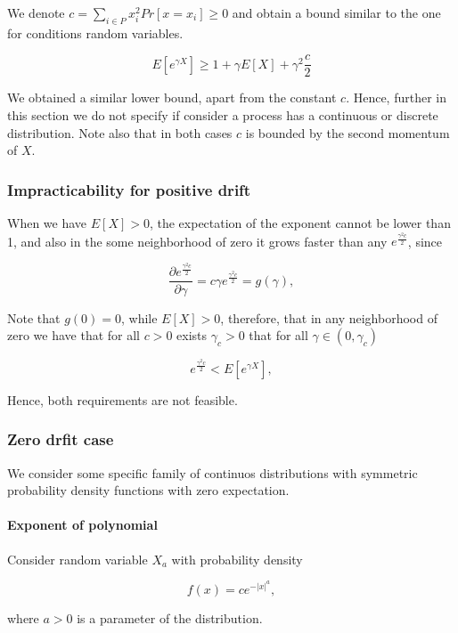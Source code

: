 \documentclass[12pt, a4paper]{article}
\theoremstyle{remark}
\theoremstyle{definition}
\newcommand{\expx}[1]{e^{-|x|^{#1}}}
\begin{document}
We denote $c = \sum_{i \in P} x_i^2 Pr[x = x_i] \geq 0$ and obtain a bound similar to the one for conditions random variables.

\[
    E[e^{\gamma X}] \geq 1 + \gamma E[X] + \gamma^2 \frac{c}{2}
\]


We obtained a similar lower bound, apart from the constant \(c\). Hence,
further in this section we do not specify if consider a process has a continuous or discrete distribution. Note also that in both cases \(c\) is bounded by the second momentum of \(X\).

\subsubsection{Impracticability for positive drift}

When we have \(E\left[X\right] > 0\), the expectation of the exponent cannot be lower than 1, and also in the some neighborhood of zero it grows faster than any $e^{\frac{\gamma^2 c}{2}}$, since

$$\frac{\partial e^{\frac{\gamma^2 c}{2}}}{\partial \gamma} = c\gamma e^{\frac{\gamma^2 c}{2}} = g(\gamma),$$

Note that $g(0) = 0$, while $E[X] > 0$, therefore, that in any neighborhood of zero we have that for all \(c>0\) exists \(\gamma_c > 0\)  that for all \(\gamma \in (0, \gamma_c)\) 

$$e^{\frac{\gamma^2 c}{2}} < E[e^{\gamma X}],$$


Hence, both requirements are not feasible.

\subsubsection{Zero drfit case}
\label{sec:zero}

We consider some specific family of continuos distributions with symmetric probability density functions with zero expectation.

\paragraph*{Exponent of polynomial}

\hfill

\hfill

Consider random variable \(X_a\) with probability density

$$f(x) = c \expx{a},$$

where \(a > 0\) is a parameter of the distribution.
\end{document}
